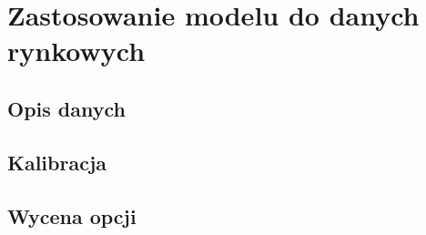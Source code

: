 \chapter{Zastosowanie modelu do danych rynkowych}

\label{ch:zastosowanie_do_danych}

\section{Opis danych}


\section{Kalibracja}


\section{Wycena opcji}


\mgrclosechapter